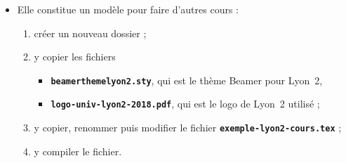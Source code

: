  \begin{itemize}
  \item Elle constitue un modèle pour faire d'autres cours :
    
    \begin{enumerate}
    \item créer un nouveau dossier ;
    \item y copier les fichiers 
      
      \begin{itemize}
      \item \texttt{\textbf{beamerthemelyon2.sty}}, qui est le thème Beamer pour Lyon~2,
      \item \texttt{\textbf{logo-univ-lyon2-2018.pdf}}, qui est le logo de Lyon~2 utilisé ;
      \end{itemize}
      
    \item y copier, renommer puis modifier le fichier \texttt{\textbf{exemple-lyon2-cours.tex}} ;
    \item y compiler le fichier.
    \end{enumerate}
  \end{itemize}
